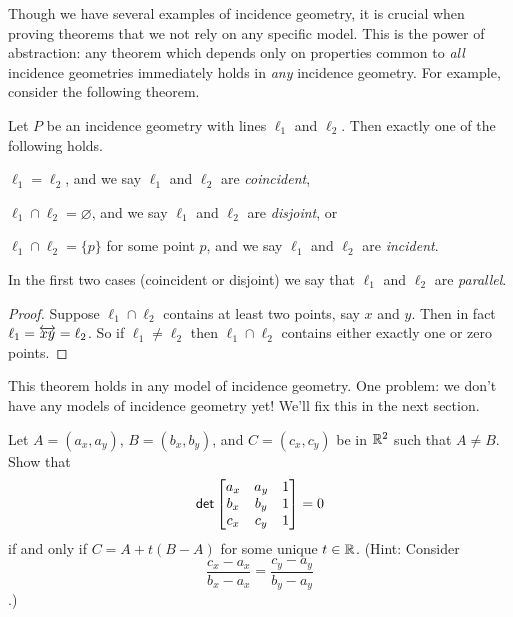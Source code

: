 Though we have several examples of incidence geometry, it is crucial when proving theorems that we not rely on any specific model.
This is the power of abstraction: any theorem which depends only on properties common to \emph{all} incidence geometries immediately holds in \emph{any} incidence geometry.
For example, consider the following theorem.

\begin{prop}
Let \(P\) be an incidence geometry with lines \(\ell_1\) and \(\ell_2\).
Then exactly one of the following holds.
\begin{proplist}
\item \(\ell_1 = \ell_2\), and we say \(\ell_1\) and \(\ell_2\) are \emph{coincident},
\item \(\ell_1 \cap \ell_2 = \varnothing\), and we say \(\ell_1\) and \(\ell_2\) are \emph{disjoint}, or
\item \(\ell_1 \cap \ell_2 = \{p\}\) for some point \(p\), and we say \(\ell_1\) and \(\ell_2\) are \emph{incident}.
\end{proplist}
In the first two cases (coincident or disjoint) we say that \(\ell_1\) and \(\ell_2\) are \emph{parallel}.
\end{prop}

\begin{proof}
Suppose \(\ell_1 \cap \ell_2\) contains at least two points, say \(x\) and \(y\).
Then in fact \(\ell_1 = \overleftrightarrow{xy} = \ell_2\).
So if \(\ell_1 \neq \ell_2\) then \(\ell_1 \cap \ell_2\) contains either exactly one or zero points.
\end{proof}

This theorem holds in any model of incidence geometry.
One problem: we don't have any models of incidence geometry yet!
We'll fix this in the next section.



\Exercises%

\begin{exercise}\label{exerc:rr2-collinear-comb}
Let \(A = (a_x, a_y)\), \(B = (b_x, b_y)\), and \(C = (c_x, c_y)\) be in \(\mathbb{R}^2\) such that \(A \neq B\).
Show that \[ \mathsf{det} \begin{bmatrix} a_x & a_y & 1 \\ b_x & b_y & 1 \\ c_x & c_y & 1 \end{bmatrix} = 0 \] if and only if \(C = A + t(B - A)\) for some unique \(t \in \mathbb{R}\).
(Hint: Consider \[ \frac{c_x - a_x}{b_x - a_x} = \frac{c_y - a_y}{b_y - a_y} \].)
\end{exercise}

